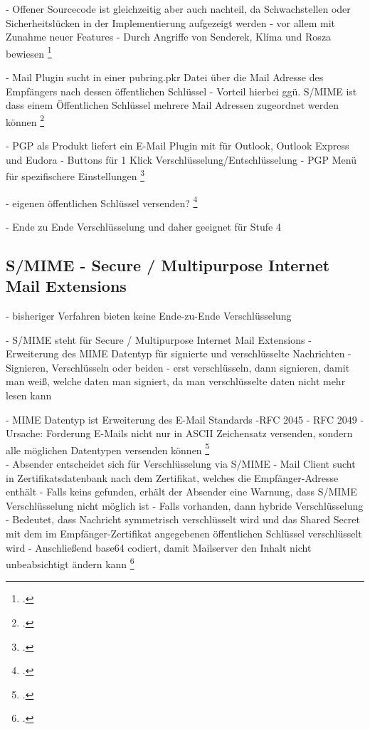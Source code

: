 \documentclass  [paper=a4,
				fontsize=12pt,
				listof=totoc,
				bibliography=totoc
				]{scrreprt}
\begin{document}
				- Offener Sourcecode ist gleichzeitig aber auch nachteil, da Schwachstellen oder Sicherheitslücken in der Implementierung aufgezeigt werden - vor allem mit Zunahme neuer Features
				- Durch Angriffe von Senderek, Klíma und Rosza bewiesen
				\footcite[][S. 47-55]{Schwenk}
				
				
				- Mail Plugin sucht in einer pubring.pkr Datei über die Mail Adresse des Empfängers nach dessen öffentlichen Schlüssel
				- Vorteil hierbei ggü. S/MIME ist dass einem Öffentlichen Schlüssel mehrere Mail Adressen zugeordnet werden können
				\footcite[][S. 40]{Schwenk}
				
				- PGP als Produkt liefert ein E-Mail Plugin mit für Outlook, Outlook Express und Eudora
				- Buttons für 1 Klick Verschlüsselung/Entschlüsselung
				- PGP Menü für spezifischere Einstellungen
				\footcite[][S. 38]{Schwenk}
				
				
				- eigenen öffentlichen Schlüssel versenden?
				\footcite[][S. 40]{Schwenk}
				
				- Ende zu Ende Verschlüsselung und daher geeignet für Stufe 4
				
				
				
				
				
			\subsection{S/MIME - Secure / Multipurpose Internet Mail Extensions}
			
				- bisheriger Verfahren bieten keine Ende-zu-Ende Verschlüsselung
							
				- S/MIME steht für Secure / Multipurpose Internet Mail Extensions
				- Erweiterung des MIME Datentyp für signierte und verschlüsselte Nachrichten
				- Signieren, Verschlüsseln oder beiden
				- erst verschlüsseln, dann signieren, damit man weiß, welche daten man signiert, da man verschlüsselte daten nicht mehr lesen kann
				
				
				- MIME Datentyp ist Erweiterung des E-Mail Standards
				-RFC 2045 - RFC 2049
				- Ursache: Forderung E-Mails nicht nur in ASCII Zeichensatz versenden, sondern alle möglichen Datentypen versenden können
				\footcite[][S. 57-60]{Schwenk}\medskip\\										
				- Absender entscheidet sich für Verschlüsselung via S/MIME
				- Mail Client sucht in Zertifikatsdatenbank nach dem Zertifikat, welches die Empfänger-Adresse enthält
				- Falls keins gefunden, erhält der Absender eine Warnung, dass S/MIME Verschlüsselung nicht möglich ist
				- Falls vorhanden, dann hybride Verschlüsselung
				- Bedeutet, dass Nachricht symmetrisch verschlüsselt wird und das Shared Secret mit dem im Empfänger-Zertifikat angegebenen öffentlichen Schlüssel verschlüsselt wird
				- Anschließend base64 codiert, damit Mailserver den Inhalt nicht unbeabsichtigt ändern kann
				\footcite[][S. 65]{Schwenk}
				
\end{document}
